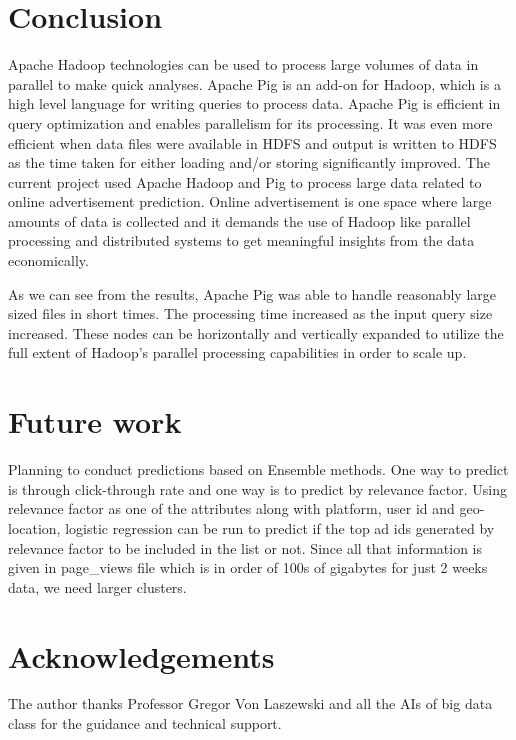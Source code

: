 \documentclass[9pt,twocolumn,twoside]{../../styles/osajnl}
\begin{document}
\section{Conclusion}
Apache Hadoop technologies can be used to process large volumes of data in parallel to make quick analyses. Apache Pig is an add-on for Hadoop, which is a high level language for writing queries to process data. Apache Pig is efficient in query optimization and enables parallelism for its processing. It was even more efficient when data files were available in HDFS and output is written to HDFS as the time taken for either loading and/or storing significantly improved. The current project used Apache Hadoop and Pig to process large data related to online advertisement prediction. Online advertisement is one space where large amounts of data is collected and it demands the use of Hadoop like parallel processing and distributed systems to get meaningful insights from the data economically. 

As we can see from the results, Apache Pig was able to handle reasonably large sized files in short times. The processing time increased as the input query size increased. These nodes can be horizontally and vertically expanded to utilize the full extent of Hadoop's parallel processing capabilities in order to scale up. 

\section{Future work}

Planning to conduct predictions based on Ensemble methods. One way to predict is through click-through rate and one way is to predict by relevance factor. Using relevance factor as one of the attributes along with platform, user id and geo-location, logistic regression can be run to predict if the top ad ids generated by relevance factor to be included in the list or not. Since all that information is given in page\_views file which is in order of 100s of gigabytes for just 2 weeks data, we need larger clusters. 

\section*{Acknowledgements}
The author thanks Professor Gregor Von Laszewski and all the AIs of big data class for the guidance and technical support.


 
\end{document}
